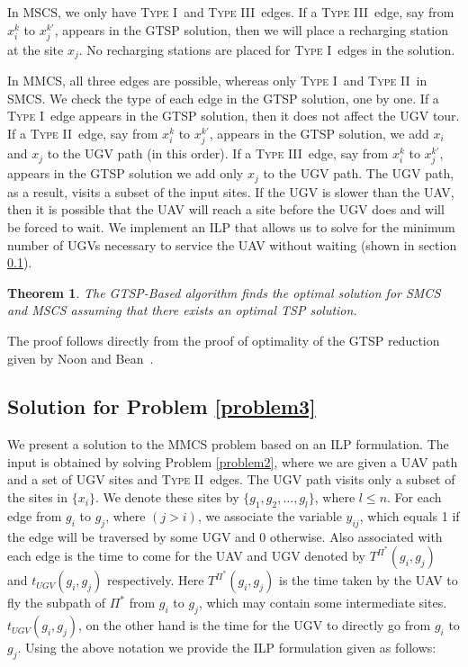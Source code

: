 \documentclass[letterpaper,10pt,conference]{ieeeconf}
\newcommand{\typeone}{\textsc{Type I\ }}
\newcommand{\typetwo}{\textsc{Type II\ }}
\newcommand{\typethree}{\textsc{Type III\ }}
\newtheorem{theorem}{Theorem}
\begin{document}
In MSCS, we only have \typeone and \typethree edges. If a \typethree edge, say from $x_i^k$ to $x_j^{k'}$, appears in the GTSP solution, then we will place a recharging station at the site $x_j$. No recharging stations are placed for \typeone edges in the solution.

In MMCS, all three edges are possible, whereas only \typeone and \typetwo in SMCS. We check the type of each edge in the GTSP solution, one by one. If a \typeone edge appears in the GTSP solution, then it does not affect the UGV tour. If a \typetwo edge, say from $x_i^k$ to $x_j^{k'}$, appears in the GTSP solution, we add $x_i$ and $x_j$ to the UGV path (in this order). If a \typethree edge, say from $x_i^k$ to $x_j^{k'}$, appears in the GTSP solution we add only $x_j$ to the UGV path. The UGV path, as a result, visits a subset of the input sites. %
If the UGV is slower than the UAV, then it is possible that the UAV will reach a site before the UGV does and will be forced to wait. We implement an ILP that allows us to solve for the minimum number of UGVs necessary to service the UAV without waiting (shown in section \ref{sec:ILP}).

\begin{theorem}
The GTSP-Based algorithm finds the optimal solution for SMCS and MSCS assuming that there exists an optimal TSP solution.
\end{theorem}
The proof follows directly from the proof of optimality of the GTSP reduction given by Noon and Bean~\cite{noon1993efficient}.%

\subsection{Solution for Problem \ref{problem3}} \label{sec:ILP}
We present a solution to the MMCS problem based on an ILP formulation. The input is obtained by solving Problem \ref{problem2}, where we are given a UAV path and a set of UGV sites and \typetwo edges. The UGV path visits only a subset of the sites in $\{x_i\}$. We denote these sites by $\{g_1, g_2, \ldots, g_l\}$, where $l\leq n$. For each edge from $g_i$ to $g_j$, where $(j>i)$, we associate the variable $y_{ij}$, which equals 1 if the edge will be traversed by some UGV and 0 otherwise. Also associated with each edge is the time to come for the UAV and UGV denoted by $T^{\Pi^*}(g_i,g_j)$ and $t_{UGV}(g_i,g_j)$ respectively. Here $T^{\Pi^*}(g_i,g_j)$ is the time taken by the UAV to fly the subpath of $\Pi^*$ from $g_i$ to $g_j$, which may contain some intermediate sites. $t_{UGV}(g_i,g_j)$, on the other hand is the time for the UGV to directly go from $g_i$ to $g_j$. Using the above notation we provide the ILP formulation given as follows:
\end{document}
